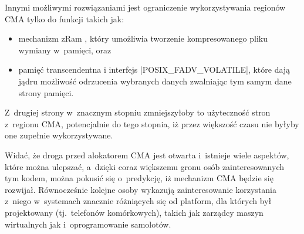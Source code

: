 Innymi możliwymi rozwiązaniami jest ograniczenie wykorzystywania
regionów CMA tylko do funkcji takich jak:

\begin{itemize}
\item mechanizm zRam \autocite{patch:zram}, który umożliwia tworzenie
  kompresowanego pliku wymiany w~pamięci, oraz
\item pamięć transcendentna \autocite{bib:transcendent} i interfejs
  \code|POSIX_FADV_VOLATILE|, które dają jądru możliwość odrzucenia
  wybranych danych zwalniając tym samym dane strony pamięci.
\end{itemize}

Z~drugiej strony w~znacznym stopniu zmniejszyłoby to użyteczność stron
z~regionu CMA, potencjalnie do tego stopnia, iż przez większość czasu
nie byłyby one zupełnie wykorzystywane.

Widać, że droga przed alokatorem CMA jest otwarta i~istnieje wiele
aspektów, które można ulepszać, a~dzięki coraz większemu gronu osób
zainteresowanych tym kodem, można pokusić się o~predykcję, iż
mechanizm CMA będzie się rozwijał.  Równocześnie kolejne osoby
wykazują zainteresowanie korzystania z~niego w~systemach znacznie
różniących się od platform, dla których był projektowany
(tj.\ telefonów komórkowych), takich jak zarządcy maszyn wirtualnych
jak i~oprogramowanie samolotów.
